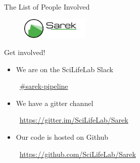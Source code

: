 \documentclass{beamer}
\begin{document}
\begin{frame}{The List of People Involved}
	\begin{figure}
		\includegraphics[height=1cm]{pictures/Sarek}
	\end{figure}
	\begin{table}
	\end{table}
\end{frame}

\begin{frame}{Get involved!}
	\begin{itemize}
		\item We are on the SciLifeLab Slack

		\faSlack\ \href{https://scilifelab.slack.com/}{\#sarek-pipeline}
	\end{itemize}
	\pause
	\begin{itemize}
		\item We have a gitter channel

		\faGroup\ \url{https://gitter.im/SciLifeLab/Sarek}
	\end{itemize}
	\pause
	\begin{itemize}
		\item Our code is hosted on Github

		\faGithub\ \url{https://github.com/SciLifeLab/Sarek}
	\end{itemize}
\end{frame}
\end{document}

